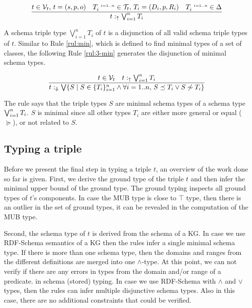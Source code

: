 \documentclass[runningheads]{llncs}
\newcommand{\s}{\scriptscriptstyle\ \,}
\newcommand{\uarr}{\uparrow}
\newcommand{\Darr}{\Downarrow}
\newcommand{\V}{{\cal V}}
\newcommand{\T}{{\cal T}}
\begin{document}
\begin{equation}
\label{rul:3-stored2}
\dfrac{t\in\V_t,\, t=(s,p,o)\quad T_i^{\s\/i=1..n}\in\T_t,\, T_i=(D_i,p,R_i)\quad\/T_i^{\s\/i=1..n}\in\Delta}
      {t:_\uarr\/\bigvee_{i=1}^n\/T_i}
\end{equation}

A schema triple type $\bigvee_{i=1}^nT_i$ of $t$ is a disjunction of
all valid schema triple types of $t$. Similar to Rule \ref{rul:min},
which is defined to find minimal types of a set of classes, the
following Rule \ref{rul:3-min} generates the disjunction of minimal
schema types.

\begin{equation}
\label{rul:3-min}
\dfrac{t\in\V_t\quad\/t:_\uarr\bigvee_{i=1}^n\/T_i}
      {t:_{\Darr}\bigvee\{S \mid S\in\/\{T_i\}_{i=1}^n\land\forall\/i=1..n,\, S\preceq\/T_i\lor\/S\not\sim\/T_i\}}
\end{equation}

The rule says that the triple types $S$ are minimal schema types of a
schema type $\bigvee_{i=1}^n\/T_i$. $S$ is minimal since all other
types $T_i$ are either more general or equal ($\succeq$), or not
related to $S$. 





\subsection{Typing a triple}

Before we present the final step in typing a triple $t$, an overview
of the work done so far is given. First, we derive the ground type of
the triple $t$ and then infer the minimal upper bound of the ground
type. The ground typing inspects all ground types of $t$'s
components. In case the MUB type is close to $\top$ type, then there is
an outlier in the set of ground types, it can be revealed in
the computation of the MUB type. 

Second, the schema type of $t$ is derived from the schema of a KG. In
case we use RDF-Schema semantics of a KG then the rules infer a single
minimal schema type. If there is more than one schema type, then the
domains and ranges from the different definitions are merged into one
$\land$-type. At this point, we can not verify if there are any errors
in types from the domain and/or range of a predicate. in schema
(stored) typing. In case we use RDF-Schema with $\land$ and $\lor$
types, then the rules can infer multiple disjunctive schema
types. Also in this case, there are no additional constraints that
could be verified.
\end{document}
